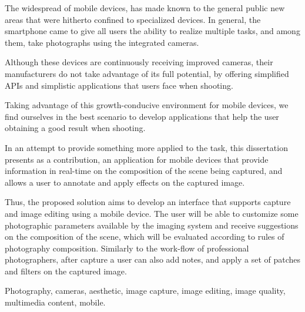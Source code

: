 \abstractEN

The widespread of mobile devices, has made known to the general public new areas that were hitherto confined to specialized devices. In general, the smartphone came to give all users the ability to realize multiple tasks, and among them, take photographs using the integrated cameras.


Although these devices are continuously receiving improved cameras, their manufacturers do not take advantage of its full potential, by offering simplified APIs and simplistic applications that users face when shooting.


Taking advantage of this growth-conducive environment for mobile devices, we find ourselves in the best scenario to develop applications that help the user obtaining a good result when shooting.


In an attempt to provide something more applied to the task, this dissertation presents as a contribution, an application for mobile devices that provide information in real-time on the composition of the scene being captured, and allows a user to annotate and apply effects on the captured image.

Thus, the proposed solution aims to develop an interface that supports capture and image editing using a mobile device. The user will be able to customize some photographic parameters available by the imaging system and receive suggestions on the composition of the scene, which will be evaluated according to rules of photography composition. Similarly to the work-flow of professional photographers, after capture a user can also add notes, and apply a set of patches and filters on the captured image.

\begin{keywords}
Photography, cameras, aesthetic, image capture, image editing, image quality, multimedia content, mobile.
\end{keywords}

